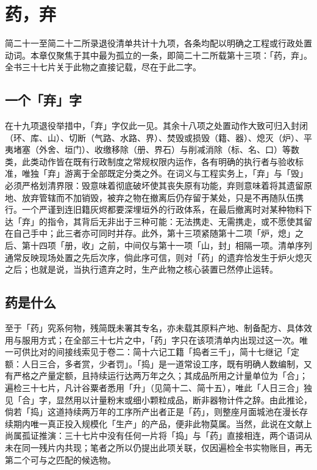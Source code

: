 \chapter{药，弃}

简二十一至简二十二所录退役清单共计十九项，各条均配以明确之工程或行政处置动词。本章仅聚焦于其中最为孤立的一条，即简二十二所载第十三项：「药，弃」。全书三十七片关于此物之直接记载，尽在于此二字。

\section{一个「弃」字}

在十九项退役举措中，「弃」字仅此一见。其余十八项之处置动作大致可归入封闭（环、库、山）、切断（气路、水路、界）、焚毁或损毁（籍、器）、熄灭（炉）、平夷堵塞（外舍、垣门）、收缴移除（册、界石）与削减消除（标、名、口）等数类，此类动作皆在既有行政制度之常规权限内运作，各有明确的执行者与验收标准，唯独「弃」游离于全部既定分类之外。在词义与工程实务上，「弃」与「毁」必须严格划清界限：毁意味着彻底破坏使其丧失原有功能，弃则意味着将其遗留原地、放弃管辖而不加销毁，被弃之物在撤离后仍存留于某处，只是不再随队伍携行。一个严谨到连旧籍灰烬都要深埋垣外的行政体系，在最后撤离时对某种物料下达「弃」的指令，其背后无非出于三种可能：无法携走、无需携走，或不愿使其留在自己手中；此三者亦可同时并存。此外，第十三项紧随第十二项「炉，熄」之后、第十四项「册，收」之前，中间仅与第十一项「山，封」相隔一项。清单序列通常反映现场处置之先后次序，倘此序可信，则对「药」的遗弃恰发生于炉火熄灭之后；也就是说，当执行遗弃之时，生产此物之核心装置已然停止运转。

\section{药是什么}

至于「药」究系何物，残简既未署其专名，亦未载其原料产地、制备配方、具体效用与服用方式；在全部三十七片之中，「药」字只在该项清单内出现过这一次。唯一可供比对的间接线索见于卷二：简十六记工籍「捣者三千」，简十七继记「定额：人日三合，多者赏，少者罚」。「捣」是一道常设工序，既有明确人数编制，又有严格之产量定额，且持续运行达两万年之久；其成品所用之计量单位为「合」；遍检三十七片，凡计谷粟者悉用「升」（见简十二、简十五），唯此「人日三合」独见「合」字，显然用以计量粉末或细小颗粒成品，断非器物计件之辞。由此推论，倘若「捣」这道持续两万年的工序所产出者正是「药」，则整座月面城池在漫长存续期内唯一真正投入规模化「生产」的产品，便非此物莫属。当然，此说在文献上尚属孤证推演：三十七片中没有任何一片将「捣」与「药」直接相连，两个语词从未在同一残片内共现；笔者之所以仍提出此项关联，仅因遍检全书实物账目，再无第二个可与之匹配的候选物。

